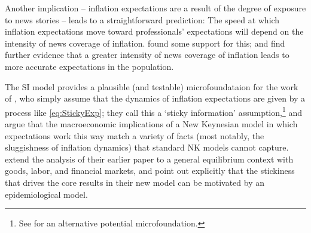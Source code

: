 Another implication -- inflation expectations are a result of the degree of exposure to news stories -- leads to a straightforward prediction:  The speed at which inflation expectations move toward professionals' expectations will depend on the intensity of news coverage of inflation.  \cite{carroll2003macroeconomic} found some support for this; \cite{lamla2014role} and \cite{larsen2021news} find further evidence that a greater intensity of news coverage of inflation leads to more accurate expectations in the population.  %




The SI model provides a plausible (and testable) microfoundataion for the work of \cite{mr2002Sticky}, who simply assume that the dynamics of inflation expectations are given by a process like \eqref{eq:StickyExp}; they call this a `sticky information' assumption,\footnote{See \bvbayesianlearningFull  for an alternative potential microfoundation.} and argue that the macroeconomic implications of a New Keynesian model in which expectations work this way match a variety of facts (most notably, the sluggishness of inflation dynamics) that standard NK models cannot capture.  \cite{mankiw2007sticky} extend the analysis of their earlier paper to a general equilibrium context with goods, labor, and financial markets, and point out explicitly that the stickiness that drives the core results in their new model can be motivated by an epidemiological model.


